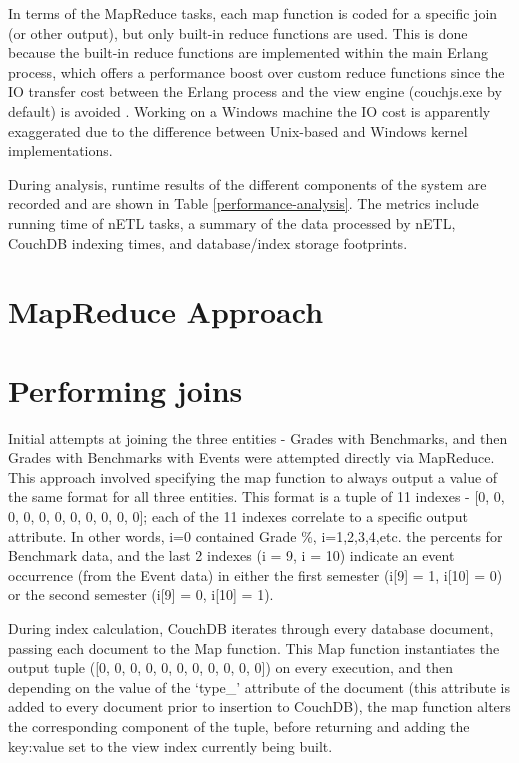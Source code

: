 In terms of the MapReduce tasks, each map function is coded for a specific join (or other output), but only built-in reduce functions are used. This is done because the built-in reduce functions are implemented within the main Erlang process, which offers a performance boost over custom reduce functions since the IO transfer cost between the Erlang process and the view engine (couchjs.exe by default) is avoided \cite{slack1Nov}. Working on a Windows machine the IO cost is apparently exaggerated due to the difference between Unix-based and Windows kernel implementations.

During analysis, runtime results of the different components of the system are recorded and are shown in Table \ref{performance-analysis}. The metrics include running time of nETL tasks, a summary of the data processed by nETL, CouchDB indexing times, and database/index storage footprints.



\section{MapReduce Approach}


\section{Performing joins}
Initial attempts at joining the three entities - Grades with Benchmarks, and then Grades with Benchmarks with Events were attempted directly via MapReduce. This approach involved specifying the map function to always output a value of the same format for all three entities. This format is a tuple of 11 indexes - [0, 0, 0, 0, 0, 0, 0, 0, 0, 0, 0]; each of the 11 indexes correlate to a specific output attribute. In other words, i=0 contained Grade \%, i=1,2,3,4,etc. the percents for Benchmark data, and the last 2 indexes (i = 9, i = 10) indicate an event occurrence (from the Event data) in either the first semester (i[9] = 1, i[10] = 0) or the second semester (i[9] = 0, i[10] = 1).

During index calculation, CouchDB iterates through every database document, passing each document to the Map function. This Map function instantiates the output tuple ([0, 0, 0, 0, 0, 0, 0, 0, 0, 0, 0]) on every execution, and then depending on the value of the `type\_' attribute of the document (this attribute is added to every document prior to insertion to CouchDB), the map function alters the corresponding component of the tuple, before returning and adding the key:value set to the view index currently being built.

